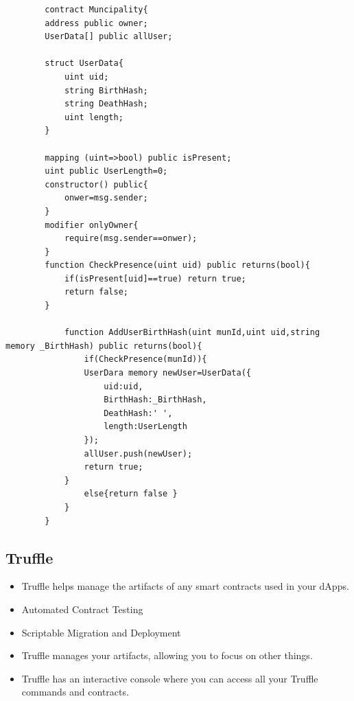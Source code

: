 \begin{lstlisting}
        contract Muncipality{
        address public owner;
        UserData[] public allUser;

        struct UserData{
            uint uid;
            string BirthHash;
            string DeathHash;
            uint length;
        }

        mapping (uint=>bool) public isPresent;
        uint public UserLength=0;
        constructor() public{
            onwer=msg.sender;
        }
        modifier onlyOwner{
            require(msg.sender==onwer);
        }
        function CheckPresence(uint uid) public returns(bool){
            if(isPresent[uid]==true) return true;
            return false;
        }
        
            function AddUserBirthHash(uint munId,uint uid,string memory _BirthHash) public returns(bool){
                if(CheckPresence(munId)){
                UserDara memory newUser=UserData({
                    uid:uid,
                    BirthHash:_BirthHash,
                    DeathHash:' ',
                    length:UserLength
                });
                allUser.push(newUser);
                return true;
            }
                else{return false }
            } 
        }

\end{lstlisting}

\subsection*{Truffle}
\begin{itemize}
    \item Truffle helps manage the artifacts of any smart contracts used in your dApps. 
    \item Automated Contract Testing
    \item Scriptable Migration and Deployment
    \item Truffle manages your artifacts, allowing you to focus on other things.
    \item Truffle has an interactive console where you can access all your Truffle commands and contracts.
\end{itemize}

